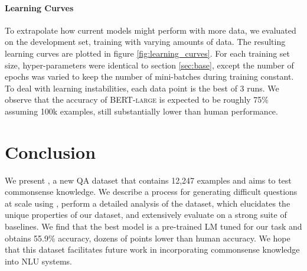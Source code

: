 \paragraph{Learning Curves} To extrapolate how current models might perform with more data, we evaluated  on the development set, training with varying amounts of data. The resulting learning curves are plotted in figure \ref{fig:learning_curves}. For each training set size, hyper-parameters were identical to section \ref{sec:base}, except the number of epochs was varied to keep the number of mini-batches during training constant. To deal with learning instabilities, each data point is the best of 3 runs. We observe that the accuracy of \textsc{BERT-large} is expected to be roughly 75\% assuming 100k examples, still substantially lower than human performance.

\section{Conclusion}

We present \csqa{}, a new QA dataset that contains 12,247 examples and aims to test commonsense knowledge. We describe a process for generating difficult questions at scale using \conceptnet{}, perform a detailed analysis of the dataset, which elucidates the unique properties of our dataset, and extensively evaluate on a strong suite of baselines. We find that the best model is a pre-trained LM tuned for our task and obtains 55.9\% accuracy, dozens of points lower than human accuracy. We hope that this dataset facilitates future work in incorporating commonsense knowledge into NLU systems.


